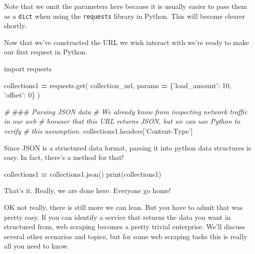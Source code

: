 \documentclass[]{book}
\newenvironment{Shaded}{\begin{snugshade}}{\end{snugshade}}
\newcommand{\AlertTok}[1]{\textcolor[rgb]{0.94,0.16,0.16}{#1}}
\newcommand{\BuiltInTok}[1]{#1}
\newcommand{\CommentTok}[1]{\textcolor[rgb]{0.56,0.35,0.01}{\textit{#1}}}
\newcommand{\DecValTok}[1]{\textcolor[rgb]{0.00,0.00,0.81}{#1}}
\newcommand{\ImportTok}[1]{#1}
\newcommand{\NormalTok}[1]{#1}
\newcommand{\OperatorTok}[1]{\textcolor[rgb]{0.81,0.36,0.00}{\textbf{#1}}}
\newcommand{\StringTok}[1]{\textcolor[rgb]{0.31,0.60,0.02}{#1}}
\begin{document}
Note that we omit the parameters here because it is usually easier to
pass them as a \texttt{dict} when using the \texttt{requests} library in Python.
This will become clearer shortly.

Now that we've constructed the URL we wish interact with we're ready
to make our first request in Python.

\begin{Shaded}
\begin{Highlighting}[]
\ImportTok{import}\NormalTok{ requests}

\NormalTok{collections1 }\OperatorTok{=}\NormalTok{ requests.get(}
\NormalTok{    collection_url,}
\NormalTok{    params }\OperatorTok{=}\NormalTok{ \{}\StringTok{'load_amount'}\NormalTok{: }\DecValTok{10}\NormalTok{,}
                  \StringTok{'offset'}\NormalTok{: }\DecValTok{0}\NormalTok{\}}
\NormalTok{)}
\end{Highlighting}
\end{Shaded}

\begin{Shaded}
\begin{Highlighting}[]
\CommentTok{# }\AlertTok{###}\CommentTok{ Parsing JSON data}
\CommentTok{# We already know from inspecting network traffic in our web}
\CommentTok{# browser that this URL returns JSON, but we can use Python to verify}
\CommentTok{# this assumption.}
\NormalTok{collections1.headers[}\StringTok{'Content-Type'}\NormalTok{]}
\end{Highlighting}
\end{Shaded}

Since JSON is a structured data format, parsing it into python data
structures is easy. In fact, there's a method for that!

\begin{Shaded}
\begin{Highlighting}[]
\NormalTok{collections1 }\OperatorTok{=}\NormalTok{ collections1.json()}
\BuiltInTok{print}\NormalTok{(collections1)}
\end{Highlighting}
\end{Shaded}

That's it. Really, we are done here. Everyone go home!

OK not really, there is still more we can lean. But you have to admit
that was pretty easy. If you can identify a service that returns the
data you want in structured from, web scraping becomes a pretty
trivial enterprise. We'll discuss several other scenarios and topics,
but for some web scraping tasks this is really all you need to know.
\end{document}
